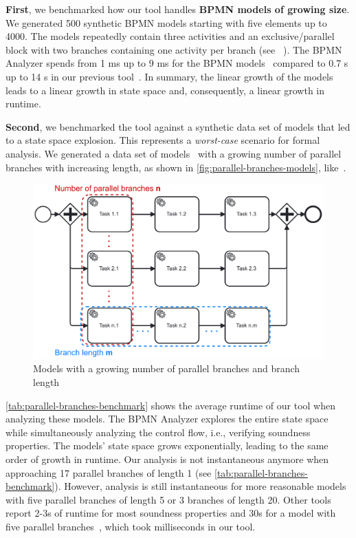 \documentclass[
onecolumn, %
]{ceurart}
\begin{document}
\textbf{First}, we benchmarked how our tool handles \textbf{BPMN models of growing size}.
We generated 500 synthetic BPMN models starting with five elements up to 4000.
The models repeatedly contain three activities and an exclusive/parallel block with two branches containing one activity per branch (see ~\cite{krauterInstantaneousComprehensibleFixable2024}).
The BPMN Analyzer spends from 1 ms up to 9 ms for the BPMN models~\cite{krauterInstantaneousComprehensibleFixable2024} compared to 0.7 s up to 14 s in our previous tool~\cite{krauterHigherorderTransformationApproach2024}.
In summary, the linear growth of the models leads to a linear growth in state space and, consequently, a linear growth in runtime.

\textbf{Second}, we benchmarked the tool against a synthetic data set of models that led to a state space explosion.
This represents a \textit{worst-case} scenario for formal analysis.
We generated a data set of models~\cite{krauterInstantaneousComprehensibleFixable2024} with a growing number of parallel branches with increasing length, as shown in \autoref{fig:parallel-branches-models}, like~\cite{corradiniFormalApproachAnalysis2021}.

\begin{figure}[ht]
	\centering
	\includegraphics[width=0.5\linewidth]{images/parallel-branches}
	\caption{Models with a growing number of parallel branches and branch length}
	\label{fig:parallel-branches-models}
\end{figure}

\autoref{tab:parallel-branches-benchmark} shows the average runtime of our tool when analyzing these models.
The BPMN Analyzer explores the entire state space while simultaneously analyzing the control flow, i.e., verifying soundness properties.
The models' state space grows exponentially, leading to the same order of growth in runtime.
Our analysis is not instantaneous anymore when approaching 17 parallel branches of length 1 (see \autoref{tab:parallel-branches-benchmark}).
However, analysis is still instantaneous for more reasonable models with five parallel branches of length 5 or 3 branches of length 20.
Other tools report 2-3s of runtime for most soundness properties and 30s for a model with five parallel branches~\cite{corradiniFormalApproachAnalysis2021}, which took milliseconds in our tool.
\end{document}
